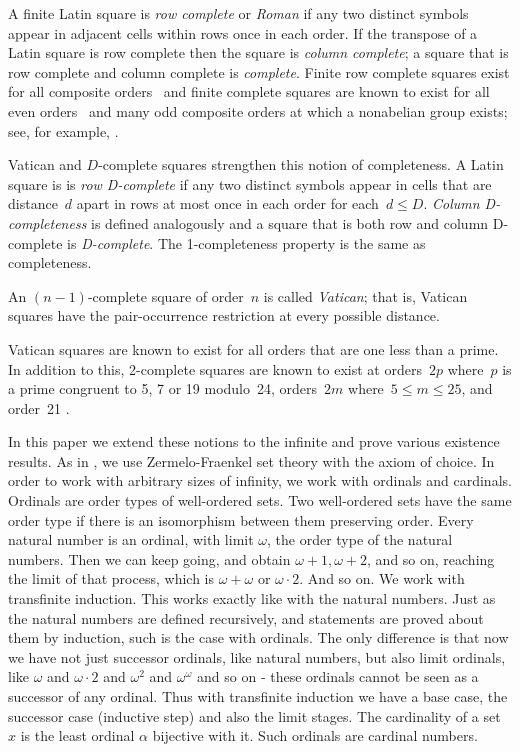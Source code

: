 \documentclass[12pt,a4paper]{article}
\begin{document}
A finite Latin square is {\em row complete} or {\em Roman} if  any two distinct symbols appear in adjacent cells within rows once in each order.  If the transpose of a Latin square is row complete then the square is {\em column complete}; a square that is row complete and column complete is {\em complete}.  Finite row complete squares exist for all composite orders~\cite{Higham98} and finite complete squares are known to exist for all even orders~\cite{Gordon61} and many odd composite orders at which a nonabelian group exists; see, for example, \cite{Ollis14}.

Vatican and $D$-complete  squares strengthen this notion of completeness. 
A Latin square is is {\em row D-complete} if any two distinct symbols appear in cells that are distance~$d$ apart in rows at most once in each order for each~$d \leq D$. {\em Column D-completeness} is defined analogously and a square that is both row and column D-complete is {\em D-complete}.  The 1-completeness property is the same as completeness.

An $(n-1)$-complete square of order~$n$ is called {\em Vatican}; that is, Vatican squares have the pair-occurrence restriction at every possible distance.

Vatican squares are known to exist for all orders that are one less than a prime.  In addition to this, 2-complete squares are known to exist at orders~$2p$ where~$p$ is a prime congruent to 5, 7 or 19 modulo~24, orders~$2m$ where~$5 \leq m \leq 25$, and order~21 \cite{TuscanCRC,OllisTFSG}.


In this paper we extend these notions to the infinite and prove various existence results.  As in \cite{CW02}, we use Zermelo-Fraenkel set theory with the axiom of choice. In order to work with arbitrary sizes of infinity, we work with ordinals and cardinals. Ordinals are order types of well-ordered sets. Two well-ordered sets have the same order type if there is an isomorphism between them preserving order. Every natural number is an ordinal, with limit $\omega$, the order type of the natural numbers. Then we can keep going, and obtain $\omega+1, \omega+2$, and so on, reaching the limit of that process, which is $\omega+\omega$ or $\omega\cdot 2$. And so on. We work with transfinite induction. This works exactly like with the natural numbers. Just as the natural numbers are defined recursively, and statements are proved about them by induction, such is the case with ordinals. The only difference is that now we have not just successor ordinals, like natural numbers, but also limit ordinals, like $\omega$ and $\omega\cdot 2$ and $\omega^2$ and $\omega^\omega$ and so on - these ordinals cannot be seen as a successor of any ordinal. Thus with transfinite induction we have a base case, the successor case (inductive step) and also the limit stages. The cardinality of a set $x$ is the least ordinal $\alpha$ bijective with it. Such ordinals are cardinal numbers. 
\end{document}
